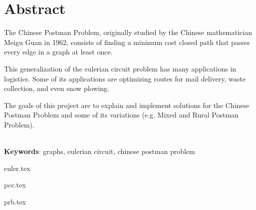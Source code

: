 \documentclass[12pt,twoside,english,brazilian]{book}
\begin{document}
\chapter*{Abstract}


The Chinese Postman Problem, originally studied by the Chinese mathematician Meigu Guan in 1962, consists of finding a minimum cost closed path that passes every edge in a graph at least once.

This generalization of the eulerian circuit problem has many applications in logistics. Some of its applications are optimizing routes for mail delivery, waste collection, and even snow plowing.

The goals of this project are to explain and implement solutions for the Chinese Postman Problem and some of its variations (e.g. Mixed and Rural Postman Problem).


\noindent \\ \textbf{Keywords}: graphs, eulerian circuit, chinese postman problem



\mainmatter


\singlespacing

\newpage
\tableofcontents
\newpage

{euler.tex}

{pcc.tex}

{prb.tex}

    \iffalse
        \section{Anotações}

        \begin{itemize}
            \item Todo mixed CPP pode ser transformado em um WPP.
        \end{itemize}

    \fi

	\medskip

    \newpage
    \printbibliography
 
\end{document}
